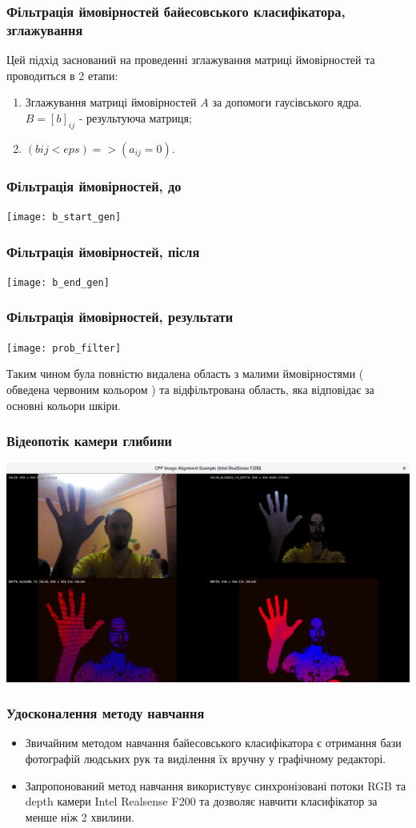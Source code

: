 \begin{frame}
	\manimate
	\frametitle{Фільтрація ймовірностей байесовського класифікатора, зглажування}
	Цей підхід заснований на проведенні зглажування матриці ймовірностей та проводиться в 2 етапи:
	\begin{enumerate}
		\item Зглажування матриці ймовірностей $A$ за допомоги гаусівського ядра. $B = [b]_{ij}$ - результуюча матриця;
		\item $ (b{ij} < eps) => (a_{ij} = 0)$.
	\end{enumerate}
\end{frame}

\begin{frame}
	\manimate
	\frametitle{Фільтрація ймовірностей, до}
	\texttt{[image: b\_start\_gen]}
\end{frame}

\begin{frame}
	\manimate
	\frametitle{Фільтрація ймовірностей, після}
	\texttt{[image: b\_end\_gen]}
\end{frame}

\begin{frame}
	\manimate
	\frametitle{Фільтрація ймовірностей, результати}
	\texttt{[image: prob\_filter]}
	
	Таким чином була повністю видалена область з малими ймовірностями ( обведена червоним кольором ) та відфільтрована  область, яка відповідає за основні кольори шкіри.
	
\end{frame}

\begin{frame}
	\manimate
	\frametitle{Відеопотік камери глибини}
	\includegraphics[width=1.0\linewidth]{im/depth_camera}
\end{frame}

\begin{frame}
	\manimate
	\frametitle{Удосконалення методу навчання}
	\begin{itemize}
		\item Звичайним методом навчання байесовського класифікатора є отримання бази фотографій людських рук та виділення їх вручну у графічному редакторі.
		
		\item Запропонований метод навчання використувує синхронізовані потоки RGB та depth камери Intel Realsense F200 та дозволяє навчити класифікатор за менше ніж 2 хвилини.
	\end{itemize}
\end{frame}